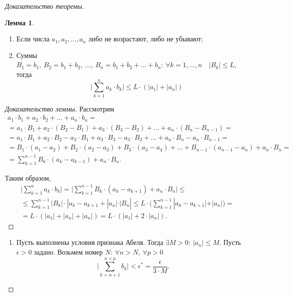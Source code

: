 \documentclass{report}
\theoremstyle{definition}
\newtheorem{lemma}{Лемма}[section]
\begin{document}
\begin{proof}[Доказательство теоремы]
  \begin{lemma}
    \begin{enumerate}
      \item Если числа $a_1,a_2,\ldots,a_n$ либо не возрастают, либо не убывают;
      \item Суммы $B_1 = b_1, \ B_2 = b_1 + b_2, \ \ldots, \ B_n = b_1 + b_2 + \ldots + b_n: \ \forall k = 1,\ldots,n \quad |B_k| \leqslant L$, тогда
            \begin{equation}
              \quad \bigg|\sum_{k=1}^{n} a_k \cdot b_k \bigg| \leqslant L\cdot (|a_1| + |a_n|)
            \end{equation}
    \end{enumerate}
  \end{lemma}

  \begin{proof}[Доказательство леммы]
    Рассмотрим
    \begin{multline*}
      a_1 \cdot b_1 + a_2 \cdot b_2 + \ldots + a_n \cdot b_n = \\
      = a_1 \cdot B_1 + a_2 \cdot (B_2 - B_1) + a_3 \cdot (B_3 - B_2) + \ldots + a_n \cdot (B_n - B_{n-1}) = \\
      = a_1 \cdot B_1 + a_2 \cdot B_2 - a_2 \cdot B_1 + a_3\cdot B_3 - a_3 \cdot B_2 + \ldots + a_n \cdot B_n - a_n \cdot B_{n-1} = \\
      = B_1\cdot (a_1 - a_2) + B_2\cdot (a_2 - a_3) + B_3 \cdot (a_3 - a_4) + \ldots + B_{n-1} \cdot (a_{n-1} - a_n) + a_n \cdot B_n = \\
      = \sum_{k=1}^{n-1} B_k \cdot (a_k - a_{k-1}) + a_n \cdot B_n.
    \end{multline*}

    Таким образом,
    \begin{multline*}
      \bigg|\sum_{k=1}^{n}a_k\cdot b_k \bigg| = \bigg|\sum_{k=1}^{n-1} B_k \cdot (a_k - a_{k+1}) + a_n \cdot B_n\bigg| \leqslant \\
      \leqslant \sum_{k=1}^{n-1}|B_k| \cdot |a_k - a_{k+1} + |a_n| \cdot |B_n| \leqslant L\cdot \bigg(\sum_{k=1}^{n-1}|a_k - a_{k+1}| + |a_n|\bigg) = \\
      = L\cdot (|a_1| + |a_n| + |a_n|) = L\cdot (|a_1| + 2\cdot |a_n|).
    \end{multline*}
  \end{proof}

  \begin{enumerate}
    \item Пусть выполнены условия признака Абеля. Тогда $\exists M > 0: \ |a_n| \leqslant M$. Пусть $\epsilon > 0$ задано. Возьмем номер $N: \ \forall n > N, \ \forall p > 0$
    \begin{equation*}
      \bigg|\sum_{k=n+1}^{n+p}b_k\bigg| < \epsilon^* = \frac{\epsilon}{3\cdot M}.
    \end{equation*}


\end{enumerate}
\end{proof}
\end{document}
